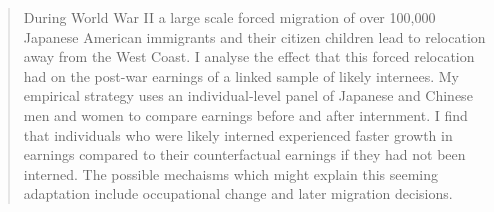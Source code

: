 \begin{abstract}
  During World War II a large scale forced migration of over 100,000
  Japanese American immigrants and their citizen children
  lead to relocation away from the West Coast.
  I analyse the effect that this forced relocation had
  on the post-war earnings of a linked sample of likely internees.
  My empirical strategy uses an individual-level panel of Japanese
  and Chinese men and women to compare earnings before and after internment.
  I find that individuals who were likely interned experienced faster growth in
  earnings compared to their counterfactual earnings if they had not been
  interned.  
  The possible mechaisms which might explain this seeming adaptation
  include occupational change and later migration decisions.
\end{abstract}